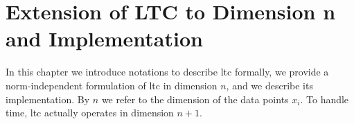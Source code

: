 \chapter{Extension of LTC to Dimension n and Implementation}
\label{chap:ltc-extension}

In this chapter we introduce notations to describe \acrshort{ltc} formally, we
provide a norm-independent formulation of \acrshort{ltc} in dimension $n$,
and we describe its implementation.
By $n$ we refer
to the dimension of the data points $x_i$. To handle time, \acrshort{ltc}
actually operates in dimension $n+1$. 





